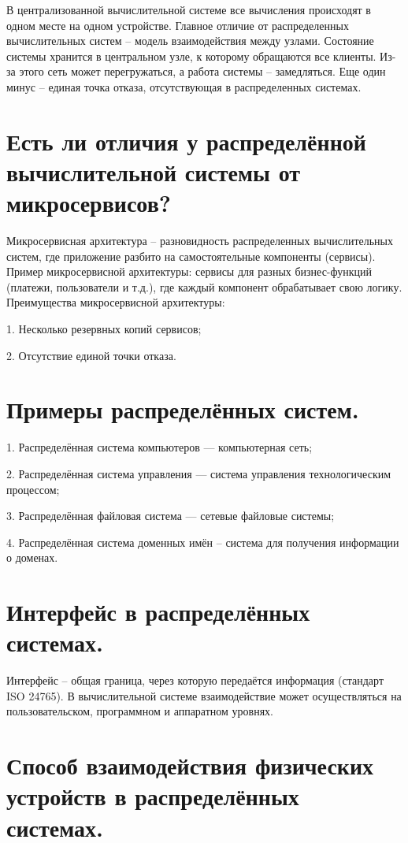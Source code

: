 \documentclass[14pt]{extarticle} %
\begin{document}
В централизованной вычислительной системе все вычисления происходят в одном месте на одном устройстве.
Главное отличие от распределенных вычислительных систем – модель взаимодействия между узлами. Состояние системы хранится в центральном узле, к которому обращаются все клиенты. Из-за этого сеть может перегружаться, а работа системы – замедляться. Еще один минус – единая точка отказа, отсутствующая в распределенных системах.

\section{Есть ли отличия у распределённой вычислительной системы от микросервисов?} \label{sec:third}

Микросервисная архитектура – разновидность распределенных вычислительных систем, где приложение разбито на самостоятельные компоненты (сервисы). Пример микросервисной архитектуры: сервисы для разных бизнес-функций (платежи, пользователи и т.д.), где каждый компонент обрабатывает свою логику. Преимущества микросервисной архитектуры:

1.	Несколько резервных копий сервисов;

2.	Отсутствие единой точки отказа.

\section{Примеры распределённых систем.} \label{sec:four}

1.	Распределённая система компьютеров — компьютерная сеть;

2.	Распределённая система управления — система управления технологическим процессом;

3.	Распределённая файловая система — сетевые файловые системы;

4.	Распределённая система доменных имён – система для получения информации о доменах.

\section{Интерфейс в распределённых системах.} \label{sec:five}

Интерфейс – общая граница, через которую передаётся информация (стандарт ISO 24765).
В вычислительной системе взаимодействие может осуществляться на пользовательском, программном и аппаратном уровнях.

\section{Способ взаимодействия физических устройств в распределённых системах.} \label{sec:six}
\end{document}
